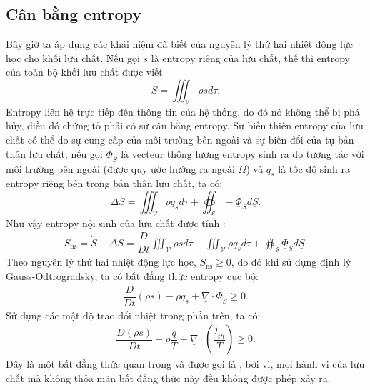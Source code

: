 \documentclass[../../../main.tex]{subfiles}
\begin{document}
\subsection{Cân bằng entropy}
    Bây giờ ta áp dụng các khái niệm đã biết của nguyên lý thứ hai nhiệt động lực học cho khối lưu chất. Nếu gọi $s$ là entropy riêng của lưu chất, thế thì entropy của toàn bộ khối lưu chất được viết 
        \[
            S=\iiint_\mathscr{V}\rho sd\tau.
            \]
            Entropy liên hệ trực tiếp đến thông tin của hệ thống, do đó nó không thể bị phá hủy, điều đó chứng tỏ phải có sự cân bằng entropy. Sự biến thiên entropy của lưu chất có thể do sự cung cấp của môi trường bên ngoài và sự biến đổi của tự bản thân lưu chất, nếu gọi $\underline{\Phi}_S$ là vecteur thông lượng entropy sinh ra do tương tác với môi trường bên ngoài (được quy ước hướng ra ngoài $\Omega$) và $q_s$ là tốc độ sinh ra entropy riêng bên trong bản thân lưu chất, ta có:
            \[
                \Delta S=\iiint_\mathscr{V}\rho q_sd\tau+\oiint_\mathscr{S}-\underline{\Phi}_Sd\underline{S}.
                \]
    Như vậy entropy nội sinh của lưu chất được tính :
    \begin{align}
        S_{\text{ns}}=\dot{S}-\Delta S=\dfrac{D}{Dt}\iiint_\mathscr{V} \rho sd\tau-\iiint_\mathscr{V}\rho q_sd\tau+\oiint_\mathscr{S}\underline{\Phi}_Sd\underline{S}.
        \end{align}
        Theo nguyên lý thứ hai nhiệt động lực học, $S_{\text{ns}}\ge0$, do đó khi sử dụng định lý Gauss-Odtrogradsky, ta có bất đẳng thức entropy cục bộ:
        \begin{align}
            \dfrac{D}{Dt}(\rho s)-\rho q_s+\underline{\nabla}\cdot\underline{\Phi}_S\ge 0.
        \end{align}
    Sử dụng các mật độ trao đổi nhiệt trong phần trên, ta có:
    \begin{align}
        \boxed{
            \dfrac{D(\rho s)}{Dt} - \rho\dfrac{q}{T} + \underline{\nabla}\cdot\left(\dfrac{\underline{j}_{th}}{T}\right)\ge 0
            }.
        \end{align}
    Đây là một bất đẳng thức quan trọng và được gọi là , bởi vì, mọi hành vi của lưu chất mà không thỏa mãn bất đẳng thức này đều không được phép xảy ra.
\end{document}
